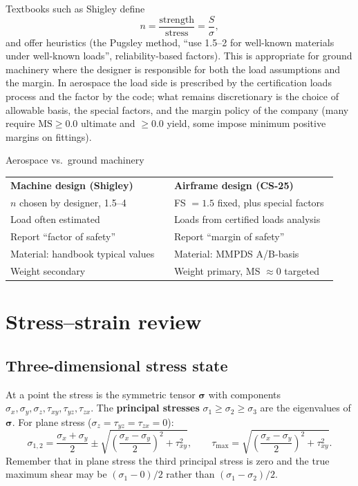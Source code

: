 \documentclass[11pt,a4paper]{article}
\begin{document}
Textbooks such as Shigley define
\begin{equation}
  n = \frac{\text{strength}}{\text{stress}} = \frac{S}{\sigma},
\end{equation}
and offer heuristics (the Pugsley method, ``use 1.5--2 for well-known materials under well-known loads'', reliability-based factors). This is appropriate for ground machinery where the designer is responsible for both the load assumptions and the margin. In aerospace the load side is prescribed by the certification loads process and the factor by the code; what remains discretionary is the choice of allowable basis, the special factors, and the margin policy of the company (many require $\mathrm{MS}\ge 0.0$ ultimate and $\ge 0.0$ yield, some impose minimum positive margins on fittings).

\begin{aerobox}{Aerospace vs.\ ground machinery}
\begin{tabular}{@{}p{0.47\linewidth}p{0.47\linewidth}@{}}
\textbf{Machine design (Shigley)} & \textbf{Airframe design (CS-25)} \\
$n$ chosen by designer, 1.5--4 & FS $=1.5$ fixed, plus special factors \\
Load often estimated & Loads from certified loads analysis \\
Report ``factor of safety'' & Report ``margin of safety'' \\
Material: handbook typical values & Material: MMPDS A/B-basis \\
Weight secondary & Weight primary, MS $\approx 0$ targeted \\
\end{tabular}
\end{aerobox}

\section{Stress--strain review}

\subsection{Three-dimensional stress state}

At a point the stress is the symmetric tensor $\bm\sigma$ with components $\sigma_x,\sigma_y,\sigma_z,\tau_{xy},\tau_{yz},\tau_{zx}$. The \textbf{principal stresses} $\sigma_1\ge\sigma_2\ge\sigma_3$ are the eigenvalues of $\bm\sigma$. For plane stress ($\sigma_z=\tau_{yz}=\tau_{zx}=0$):
\begin{equation}
  \sigma_{1,2} = \frac{\sigma_x+\sigma_y}{2} \pm \sqrt{\left(\frac{\sigma_x-\sigma_y}{2}\right)^2+\tau_{xy}^2},
  \qquad
  \tau_{\max} = \sqrt{\left(\frac{\sigma_x-\sigma_y}{2}\right)^2+\tau_{xy}^2}.
\end{equation}
Remember that in plane stress the third principal stress is zero and the true maximum shear may be $(\sigma_1-0)/2$ rather than $(\sigma_1-\sigma_2)/2$.
\end{document}
